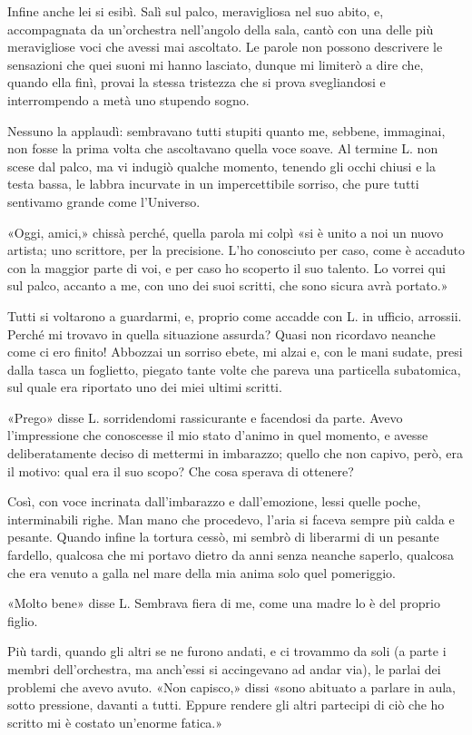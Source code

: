\documentclass[a4paper,12pt]{book}
\begin{document}
Infine anche lei si esibì. Salì sul palco, meravigliosa nel suo abito, e,
accompagnata da un’orchestra nell’angolo della sala, cantò con una delle
più meravigliose voci che avessi mai ascoltato. Le parole non possono
descrivere le sensazioni che quei suoni mi hanno lasciato, dunque mi limiterò a
dire che, quando ella finì, provai la stessa tristezza che si prova
svegliandosi e interrompendo a metà uno stupendo sogno.

Nessuno la applaudì: sembravano tutti stupiti quanto me, sebbene, immaginai,
non fosse la prima volta che ascoltavano quella voce soave. Al termine L. non
scese dal palco, ma vi indugiò qualche momento, tenendo gli occhi chiusi e la
testa bassa, le labbra incurvate in un impercettibile sorriso, che pure tutti
sentivamo grande come l’Universo.

«Oggi, amici,» chissà perché, quella parola mi colpì «si è unito a noi un
nuovo artista; uno scrittore, per la precisione. L’ho conosciuto per caso,
come è accaduto con la maggior parte di voi, e per caso ho scoperto il suo
talento. Lo vorrei qui sul palco, accanto a me, con uno dei suoi scritti, che
sono sicura avrà portato.»

Tutti si voltarono a guardarmi, e, proprio come accadde con L. in ufficio,
arrossii. Perché mi trovavo in quella situazione assurda? Quasi non ricordavo
neanche come ci ero finito! Abbozzai un sorriso ebete, mi alzai e, con le mani
sudate, presi dalla tasca un foglietto, piegato tante volte che pareva una
particella subatomica, sul quale era riportato uno dei miei ultimi scritti.

«Prego» disse L. sorridendomi rassicurante e facendosi da parte. Avevo
l’impressione che conoscesse il mio stato d’animo in quel momento, e avesse
deliberatamente deciso di mettermi in imbarazzo; quello che non capivo, però,
era il motivo: qual era il suo scopo? Che cosa sperava di ottenere?

Così, con voce incrinata dall’imbarazzo e dall’emozione, lessi quelle
poche, interminabili righe. Man mano che procedevo, l’aria si faceva sempre
più calda e pesante. Quando infine la tortura cessò, mi sembrò di liberarmi
di un pesante fardello, qualcosa che mi portavo dietro da anni senza neanche
saperlo, qualcosa che era venuto a galla nel mare della mia anima solo quel
pomeriggio.

«Molto bene» disse L. Sembrava fiera di me, come una madre lo è del proprio
figlio.

Più tardi, quando gli altri se ne furono andati, e ci trovammo da soli (a parte
i membri dell’orchestra, ma anch’essi si accingevano ad andar via), le
parlai dei problemi che avevo avuto. «Non capisco,» dissi «sono abituato a
parlare in aula, sotto pressione, davanti a tutti. Eppure rendere gli altri
partecipi di ciò che ho scritto mi è costato un’enorme fatica.»
\end{document}
